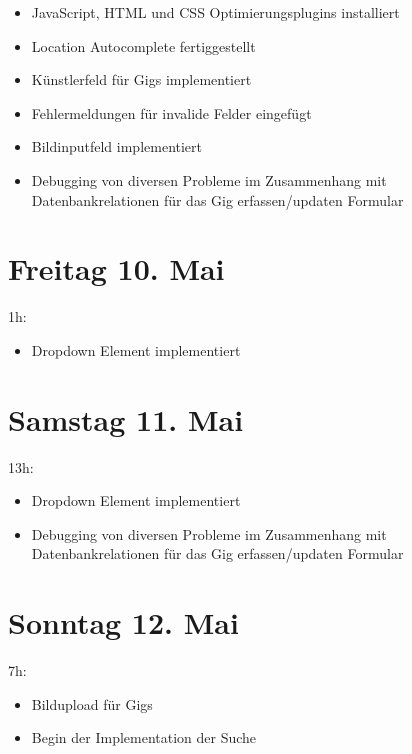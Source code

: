 \begin{itemize}
  \tightlist
  \item
        JavaScript, HTML und CSS Optimierungsplugins installiert
  \item
        Location Autocomplete fertiggestellt
  \item
        Künstlerfeld für Gigs implementiert
  \item
        Fehlermeldungen für invalide Felder eingefügt
  \item
        Bildinputfeld implementiert
  \item
        Debugging von diversen Probleme im Zusammenhang mit Datenbankrelationen
        für das Gig erfassen/updaten Formular
\end{itemize}

\section{Freitag 10. Mai}\label{freitag-10.mai}

1h:

\begin{itemize}
  \tightlist
  \item
        Dropdown Element implementiert
\end{itemize}

\section{Samstag 11. Mai}\label{samstag-11.mai}

13h:

\begin{itemize}
  \tightlist
  \item
        Dropdown Element implementiert
  \item
        Debugging von diversen Probleme im Zusammenhang mit Datenbankrelationen
        für das Gig erfassen/updaten Formular
\end{itemize}

\section{Sonntag 12. Mai}\label{sonntag-12.mai}

7h:

\begin{itemize}
  \tightlist
  \item
        Bildupload für Gigs
  \item
        Begin der Implementation der Suche
\end{itemize}

